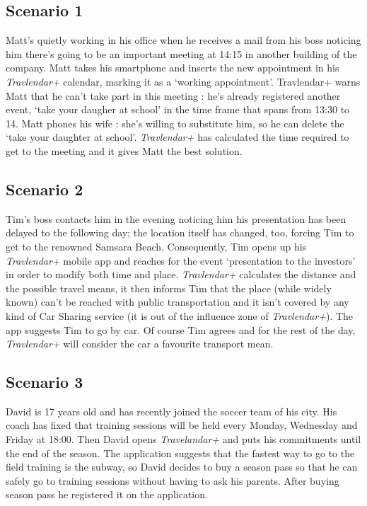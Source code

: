 \subsection*{Scenario 1}

Matt’s quietly working in his office when he receives a mail from his boss noticing him there’s going to be an important meeting at 14:15 in another building of the company.
Matt takes his smartphone and inserts the new appointment in his \textit{Travlendar+} calendar, marking it as a ‘working appointment’.
Travlendar+ warns Matt that he can’t take part in this meeting : he’s already registered another event, ‘take your daugher at school’ in the time frame that spans from 13:30 to 14.
Matt phones his wife : she’s willing to substitute him, so he can delete the ‘take your daughter at school’.
\textit{Travlendar+} has calculated the time required to get to the meeting and it gives Matt the best solution.

\subsection*{Scenario 2}

Tim’s boss contacts him in the evening noticing him his presentation has been delayed to the following day; the location itself has changed, too, forcing Tim to get to the renowned Samsara Beach.
Consequently, Tim opens up his \textit{Travlendar+} mobile app and reaches for the event ‘presentation to the investors’ in order to modify both time and place.
\textit{Travlendar+} calculates the distance and the possible travel means, it then informs Tim that the place (while widely known) can’t be reached with public transportation and it isn’t covered by any kind of Car Sharing service (it is out of the influence zone of \textit{Travlendar+}).
The app suggests Tim to go by car. Of course Tim agrees and for the rest of the day, \textit{Travlendar+} will consider the car a favourite transport mean.

\subsection*{Scenario 3}

David is 17 years old and has recently joined the soccer team of his city. His coach has fixed that training sessions will be held every Monday, Wednesday and Friday at 18:00.
Then David opens \textit{Travelandar+} and puts his commitments until the end of the season. The application suggests that the fastest way to go to the field training is the subway, so David decides to buy a season pass so that he can safely go to training sessions without having to ask his parents.
After buying season pass he registered it on the application.

